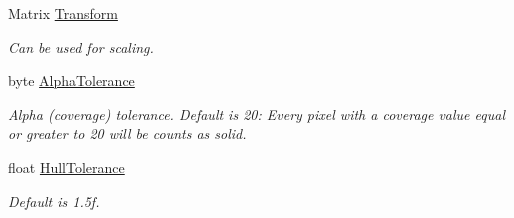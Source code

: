 \begin{DoxyCompactItemize}
Matrix \hyperlink{class_farseer_physics_1_1_common_1_1_texture_tools_1_1_texture_converter_a69dd8362fb1e579191fb62f8a6ae1359}{Transform}
\begin{DoxyCompactList}\small\item\em Can be used for scaling. \end{DoxyCompactList}\item 
byte \hyperlink{class_farseer_physics_1_1_common_1_1_texture_tools_1_1_texture_converter_a9cd8c2626f9dd33e1d181af04439766b}{Alpha\+Tolerance}
\begin{DoxyCompactList}\small\item\em Alpha (coverage) tolerance. Default is 20\+: Every pixel with a coverage value equal or greater to 20 will be counts as solid. \end{DoxyCompactList}\item 
float \hyperlink{class_farseer_physics_1_1_common_1_1_texture_tools_1_1_texture_converter_a7ae3025e2217a3d3256bf9c1b7dff34c}{Hull\+Tolerance}
\begin{DoxyCompactList}\small\item\em Default is 1.\+5f. \end{DoxyCompactList}\end{DoxyCompactItemize}


